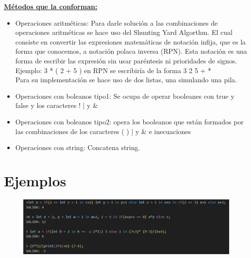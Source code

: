\documentclass[12pt, letterpaper]{article}
\begin{document}
\textbf{\underline{Métodos que la conforman: }} 
\begin{itemize}
    \item Operaciones aritméticas: Para darle solución a las combinaciones de operaciones aritméticas se hace uso del Shunting Yard Algorthm. El cual consiste en convertir las expresiones matemáticas de notación infija, que es la forma que conocemos, a notación polaca inversa (RPN). Esta notación es una forma de escribir las expresión sin usar paréntesis ni prioridades de signos. \\
     Ejemplo: 3 * ( 2 + 5 ) en RPN se escribiría de la forma 3 2 5 + * \\
     Para su implementación se hace uso de dos listas, una simulando una pila.
    \item Operaciones con boleanos tipo1: Se ocupa de operar booleanes con true y false y los caracteres ! | y \&
    \item Operaciones con boleanos tipo2: opera los booleanos que están formados por las combinaciones de los caracteres ( ) | y \& e inecuaciones
    \item Operaciones con string: Concatena string.
\end{itemize}
\newpage

\section{Ejemplos}
\begin{figure}[h]
    \includegraphics[scale= 0.85]{X.png}
\end{figure}     
\newpage
\end{document}
